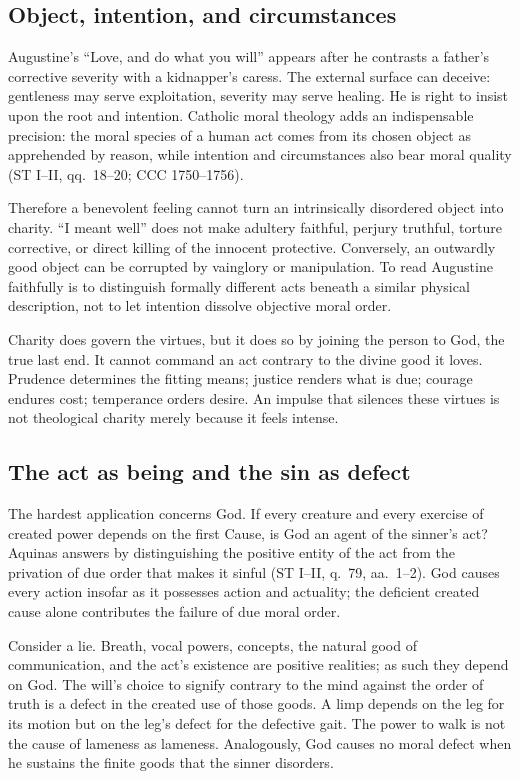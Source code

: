 \subsection{Object, intention, and circumstances}

Augustine's ``Love, and do what you will'' appears after he contrasts a father's corrective severity with a kidnapper's caress. The external surface can deceive: gentleness may serve exploitation, severity may serve healing. He is right to insist upon the root and intention. Catholic moral theology adds an indispensable precision: the moral species of a human act comes from its chosen object as apprehended by reason, while intention and circumstances also bear moral quality (ST I--II, qq.~18--20; CCC 1750--1756).

Therefore a benevolent feeling cannot turn an intrinsically disordered object into charity. ``I meant well'' does not make adultery faithful, perjury truthful, torture corrective, or direct killing of the innocent protective. Conversely, an outwardly good object can be corrupted by vainglory or manipulation. To read Augustine faithfully is to distinguish formally different acts beneath a similar physical description, not to let intention dissolve objective moral order.

Charity does govern the virtues, but it does so by joining the person to God, the true last end. It cannot command an act contrary to the divine good it loves. Prudence determines the fitting means; justice renders what is due; courage endures cost; temperance orders desire. An impulse that silences these virtues is not theological charity merely because it feels intense.

\subsection{The act as being and the sin as defect}

The hardest application concerns God. If every creature and every exercise of created power depends on the first Cause, is God an agent of the sinner's act? Aquinas answers by distinguishing the positive entity of the act from the privation of due order that makes it sinful (ST I--II, q.~79, aa.~1--2). God causes every action insofar as it possesses action and actuality; the deficient created cause alone contributes the failure of due moral order.

Consider a lie. Breath, vocal powers, concepts, the natural good of communication, and the act's existence are positive realities; as such they depend on God. The will's choice to signify contrary to the mind against the order of truth is a defect in the created use of those goods. A limp depends on the leg for its motion but on the leg's defect for the defective gait. The power to walk is not the cause of lameness as lameness. Analogously, God causes no moral defect when he sustains the finite goods that the sinner disorders.

